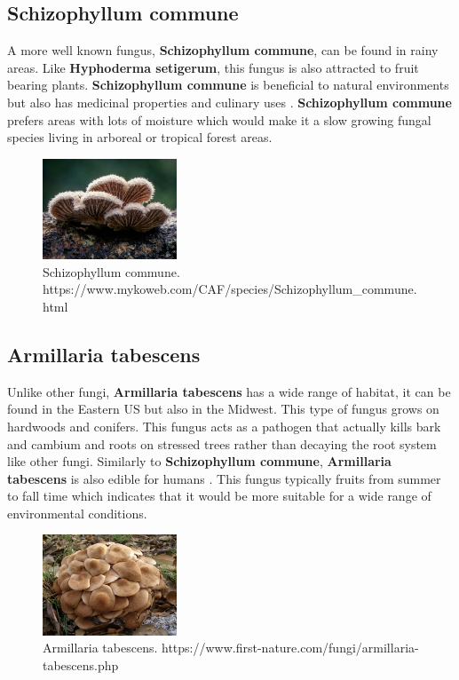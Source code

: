 \documentclass[12pt]{article}
\begin{document}
\subsection{Schizophyllum commune}
A more well known fungus, \textbf{Schizophyllum commune}, can be found in rainy areas. Like \textbf{Hyphoderma setigerum}, this fungus is also attracted to fruit bearing plants. \textbf{Schizophyllum commune} is beneficial to natural environments but also has medicinal properties and culinary uses \cite{Spitgill}. \textbf{Schizophyllum commune} prefers areas with lots of moisture which would make it a slow growing fungal species living in arboreal or tropical forest areas. 

\begin{figure}[h!]
\begin{center}
\includegraphics[width=4cm]{spitGill.jpg}
\caption{Schizophyllum commune. \centering https://www.mykoweb.com/CAF/species/Schizophyllum\_commune.html}
\end{center}
\end{figure}

\subsection{Armillaria tabescens}
Unlike other fungi, \textbf{Armillaria tabescens} has a wide range of habitat, it can be found in the Eastern US but also in the Midwest. This type of fungus grows on hardwoods and conifers. This fungus acts as a pathogen that actually kills bark and cambium and roots on stressed trees rather than decaying the root system like other fungi. Similarly to \textbf{Schizophyllum commune}, \textbf{Armillaria tabescens} is also edible for humans \cite{armill}. This fungus typically fruits from summer to fall time which indicates that it would be more suitable for a wide range of environmental conditions. 


\begin{figure}[h!]
\begin{center}
\includegraphics[width=4cm]{honeyFun.jpg}
\caption{Armillaria tabescens. \centering https://www.first-nature.com/fungi/armillaria-tabescens.php}
\end{center}
\end{figure}
\end{document}
